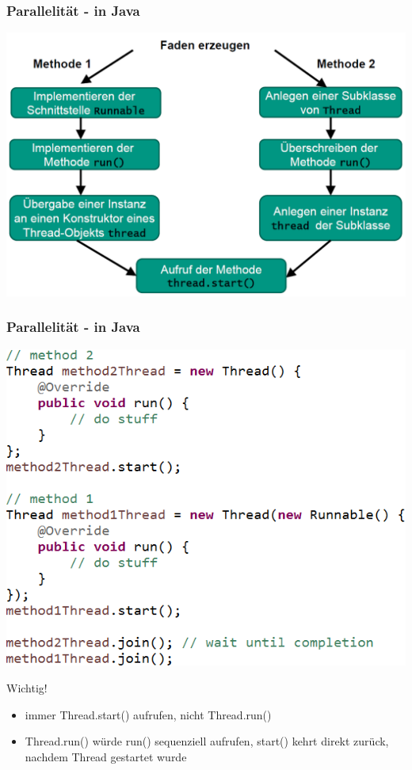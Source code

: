 \documentclass[18pt]{beamer}
\begin{document}
	\begin{frame}
		\frametitle{Parallelität - in Java}
		\includegraphics[scale=0.34]{./pics/tut5/crea-thr.png}
	\end{frame}

	\begin{frame}
		\frametitle{Parallelität - in Java}
		\centering
		\includegraphics[scale=0.43]{./pics/tut5/crea-thr-java.png}
		\pause
		\begin{alertblock}{Wichtig!}
			\begin{itemize}
				\item immer Thread.start() aufrufen, nicht Thread.run() \pause
				\item Thread.run() würde run() sequenziell aufrufen, start() kehrt direkt zurück, nachdem Thread gestartet wurde
			\end{itemize}
		\end{alertblock}
	\end{frame}
\end{document}
